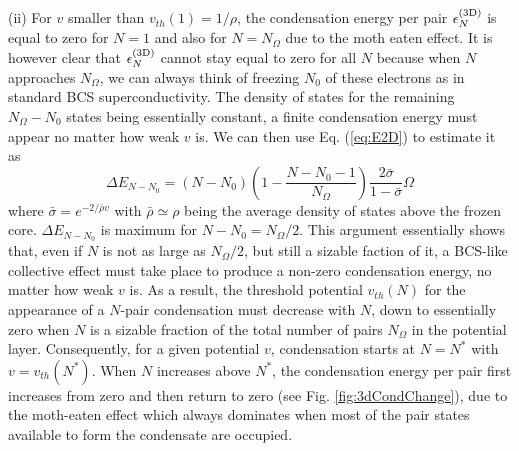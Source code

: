 \documentclass[5p,twocolumn]{elsarticle}
\begin{document}
(ii)
For $v$ smaller than $v_{th}(1)=1/\rho$, the condensation energy per pair $\epsilon_N^{{\text{(3D)}}}$ is equal to zero for $N=1$ and also for $N=N_\Omega$ due to the moth eaten effect.  It is however clear that $\epsilon_N^{{\text{(3D)}}}$ cannot stay equal to zero for all $N$ because when $N$ approaches $N_\Omega$, we can always think of freezing $N_0$ of these electrons as in standard BCS superconductivity. The density of states for the remaining $N_\Omega - N_0$ states being essentially constant, a finite condensation energy must  appear no matter how weak $v$ is.  We can then use 
Eq. (\ref{eq:E2D}) to estimate it as
\begin{equation}\label{eq:E3D}
\Delta E_{N-N_0}=(N-N_0)(1-\frac{N-N_0-1}{N_\Omega})\frac{2\bar\sigma}{1-\bar\sigma}\Omega
\end{equation}
where $\bar{\sigma}=e^{-2/{\bar{\rho}v}}$ with $\bar\rho\simeq\rho$ being the average density of states above the frozen core. $\Delta E_{N-N_0}$ is maximum for $N-N_0=N_\Omega/2$.
This argument essentially shows that, even if $N$ is not as large as $N_\Omega/2$, but still a sizable faction of it,  a BCS-like collective effect  must take place to produce a non-zero condensation energy, no matter how weak $v$ is. 
As a result, the threshold potential  $v_{th}(N)$ for the appearance of a $N$-pair condensation  must decrease with $N$, down to essentially zero when $N$ is a sizable fraction of the total number of pairs $N_\Omega$ in the potential layer.  Consequently, for a given potential $v$, condensation starts at $N=N^*$ with $v=v_{th}(N^*)$. When $N$ increases above $N^*$, the condensation energy per pair first increases from zero and then return to zero (see Fig. \ref{fig:3dCondChange}), due to the moth-eaten effect which always dominates when most of the pair states available to form the condensate are occupied. 


\end{document}
